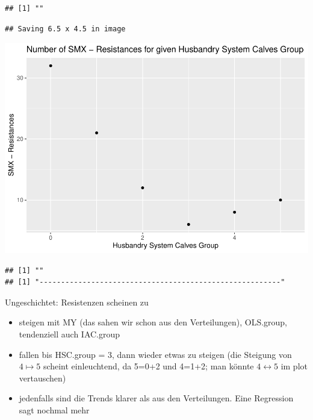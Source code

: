 \documentclass[
]{article}
\providecommand{\tightlist}{%
  \setlength{\itemsep}{0pt}\setlength{\parskip}{0pt}}
\begin{document}
\begin{verbatim}
## [1] ""
\end{verbatim}

\begin{verbatim}
## Saving 6.5 x 4.5 in image
\end{verbatim}

\includegraphics{NResistenzen_files/figure-latex/binary_or_nominal_variables-40.pdf}

\begin{verbatim}
## [1] ""
## [1] "--------------------------------------------------------"
\end{verbatim}

Ungeschichtet: Resistenzen scheinen zu

\begin{itemize}
\tightlist
\item
  steigen mit MY (das sahen wir schon aus den Verteilungen), OLS.group,
  tendenziell auch IAC.group
\item
  fallen bis HSC.group = 3, dann wieder etwas zu steigen (die Steigung
  von \(4\mapsto5\) scheint einleuchtend, da 5=0+2 und 4=1+2; man könnte
  \(4\leftrightarrow 5\) im plot vertauschen)
\item
  jedenfalls sind die Trends klarer als aus den Verteilungen. Eine
  Regression sagt nochmal mehr
\end{itemize}
\end{document}
